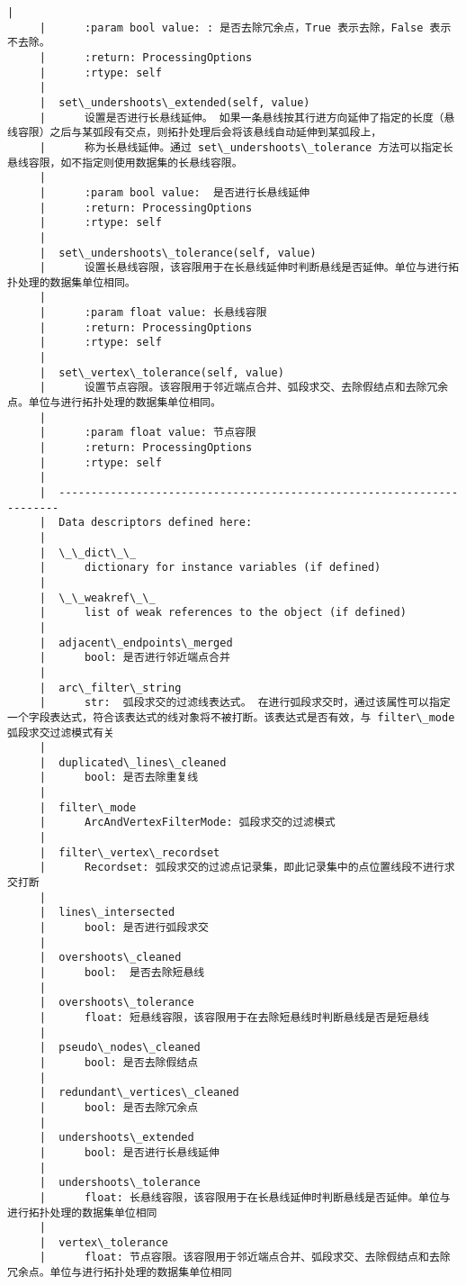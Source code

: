 \documentclass[11pt]{article}
\begin{document}
\begin{Verbatim}[commandchars=\\\{\}]
     |      
     |      :param bool value: : 是否去除冗余点，True 表示去除，False 表示不去除。
     |      :return: ProcessingOptions
     |      :rtype: self
     |  
     |  set\_undershoots\_extended(self, value)
     |      设置是否进行长悬线延伸。 如果一条悬线按其行进方向延伸了指定的长度（悬线容限）之后与某弧段有交点，则拓扑处理后会将该悬线自动延伸到某弧段上，
     |      称为长悬线延伸。通过 set\_undershoots\_tolerance 方法可以指定长悬线容限，如不指定则使用数据集的长悬线容限。
     |      
     |      :param bool value:  是否进行长悬线延伸
     |      :return: ProcessingOptions
     |      :rtype: self
     |  
     |  set\_undershoots\_tolerance(self, value)
     |      设置长悬线容限，该容限用于在长悬线延伸时判断悬线是否延伸。单位与进行拓扑处理的数据集单位相同。
     |      
     |      :param float value: 长悬线容限
     |      :return: ProcessingOptions
     |      :rtype: self
     |  
     |  set\_vertex\_tolerance(self, value)
     |      设置节点容限。该容限用于邻近端点合并、弧段求交、去除假结点和去除冗余点。单位与进行拓扑处理的数据集单位相同。
     |      
     |      :param float value: 节点容限
     |      :return: ProcessingOptions
     |      :rtype: self
     |  
     |  ----------------------------------------------------------------------
     |  Data descriptors defined here:
     |  
     |  \_\_dict\_\_
     |      dictionary for instance variables (if defined)
     |  
     |  \_\_weakref\_\_
     |      list of weak references to the object (if defined)
     |  
     |  adjacent\_endpoints\_merged
     |      bool: 是否进行邻近端点合并
     |  
     |  arc\_filter\_string
     |      str:  弧段求交的过滤线表达式。 在进行弧段求交时，通过该属性可以指定一个字段表达式，符合该表达式的线对象将不被打断。该表达式是否有效，与 filter\_mode 弧段求交过滤模式有关
     |  
     |  duplicated\_lines\_cleaned
     |      bool: 是否去除重复线
     |  
     |  filter\_mode
     |      ArcAndVertexFilterMode: 弧段求交的过滤模式
     |  
     |  filter\_vertex\_recordset
     |      Recordset: 弧段求交的过滤点记录集，即此记录集中的点位置线段不进行求交打断
     |  
     |  lines\_intersected
     |      bool: 是否进行弧段求交
     |  
     |  overshoots\_cleaned
     |      bool:  是否去除短悬线
     |  
     |  overshoots\_tolerance
     |      float: 短悬线容限，该容限用于在去除短悬线时判断悬线是否是短悬线
     |  
     |  pseudo\_nodes\_cleaned
     |      bool: 是否去除假结点
     |  
     |  redundant\_vertices\_cleaned
     |      bool: 是否去除冗余点
     |  
     |  undershoots\_extended
     |      bool: 是否进行长悬线延伸
     |  
     |  undershoots\_tolerance
     |      float: 长悬线容限，该容限用于在长悬线延伸时判断悬线是否延伸。单位与进行拓扑处理的数据集单位相同
     |  
     |  vertex\_tolerance
     |      float: 节点容限。该容限用于邻近端点合并、弧段求交、去除假结点和去除冗余点。单位与进行拓扑处理的数据集单位相同
    

\end{Verbatim}
\end{document}
